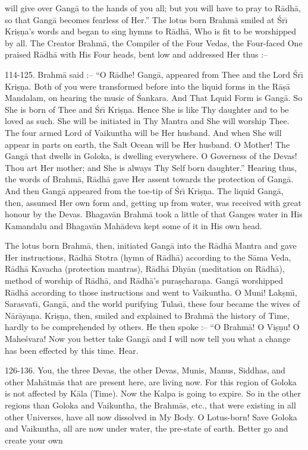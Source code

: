 will give over Gang\=a to the hands of you all; but you will have to pray to R\=adh\=a, so that Gang\=a becomes fearless of Her.'' The lotus born Brahm\=a smiled at \'Sr\={\i} Kri\d{s}\d{n}a's words and began to sing hymns to R\=adh\=a, Who is fit to be worshipped by all. The Creator Brahm\=a, the Compiler of the Four Vedas, the Four-faced One praised R\=adh\=a with His Four heads, bent low and addressed Her thus :--

114-125. Brahm\=a said :-- ``O R\=adhe! Gang\=a, appeared from Thee and the Lord \'Sr\={\i} Kri\d{s}\d{n}a. Both of you were transformed before into the liquid forms in the R\=a\d{s}\=a Mandalam, on hearing the music of \'Sankara. And That Lquid Form is Gang\=a. So She is born of Thee and \'Sr\={\i} Kri\d{s}\d{n}a. Hence She is like Thy daughter and to be loved as such. She will be initiated in Thy Mantra and She will worship Thee. The four armed Lord of Vaikuntha will be Her husband. And when She will appear in parts on earth, the Salt Ocean will be Her husband. O Mother! The Gang\=a that dwells in Goloka, is dwelling everywhere. O Governess of the Devas! Thou art Her mother; and She is always Thy Self born daughter.'' Hearing thus, the words of Brahm\=a, R\=adh\=a gave Her assent towards the protection of Gang\=a. And then Gang\=a appeared from the toe-tip of \'Sr\={\i} Kri\d{s}\d{n}a. The liquid Gang\=a, then, assumed Her own form and, getting up from water, was received with great honour by the Devas. Bhagav\=an Brahm\=a took a little of that Ganges water in His Kamandalu and Bhagav\=an Mah\=adeva kept some of it in His own head.

The lotus born Brahm\=a, then, initiated Gang\=a into the R\=adh\=a Mantra and gave Her instructions, R\=adh\=a Stotra (hymn of R\=adh\=a) according to the S\=ama Veda, R\=adh\=a Kavacha (protection mantras), R\=adh\=a Dhy\=an (meditation on R\=adh\=a), method of worship of R\=adh\=a, and R\=adh\=a's pura\d{s}chara\d{n}a. Gang\=a worshipped R\=adh\=a according to those instructions and went to Vaikuntha. O Muni! Lak\d{s}m\={\i}, Sarasvat\={\i}, Gang\=a, and the world purifying Tulas\={\i}, these four became the wives of N\=ar\=aya\d{n}a. Kri\d{s}\d{n}a, then, smiled and explained to Brahm\=a the history of Time, hardly to be comprehended by others. He then spoke :-- ``O Brahm\=a! O Vi\d{s}\d{n}u! O Mahe\'svara! Now you better take Gang\=a and I will now tell you what a change has been effected by this time. Hear.

126-136. You, the three Devas, the other Devas, Munis, Manus, Siddhas, and other Mah\=atm\=as that are present here, are living now. For this region of Goloka is not affected by K\=ala (Time). Now the Kalpa is going to expire. So in the other regions than Goloka and Vaikuntha, the Brahm\=as, etc., that were existing in all other Universes, have all now dissolved in My Body. O Lotus-born! Save Goloka and Vaikuntha, all are now under water, the pre-state of earth. Better go and create your own

